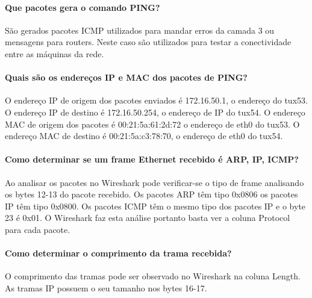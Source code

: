 \paragraph{Que pacotes gera o comando PING?}
São gerados pacotes ICMP utilizados para mandar erros da camada 3 ou mensagens para routers. Neste caso são utilizados para testar a conectividade entre as máquinas da rede.

\paragraph{Quais são os endereços IP e MAC dos pacotes de PING?}
O endereço IP de origem dos pacotes enviados é 172.16.50.1, o endereço do tux53. O endereço IP de destino é 172.16.50.254, o endereço de IP do tux54.  O endereço MAC de origem dos pacotes é 00:21:5a:61:2d:72 o endereço de eth0 do tux53. O endereço MAC de destino é 00:21:5a:c3:78:70, o endereço de eth0 do tux54. 

\paragraph{Como determinar se um frame Ethernet recebido é ARP, IP, ICMP?}
Ao analisar os pacotes no Wireshark pode verificar-se o tipo de frame analisando os bytes 12-13 do pacote recebido. Os pacotes ARP têm tipo 0x0806 os pacotes IP têm tipo 0x0800. Os pacotes ICMP têm o mesmo tipo dos pacotes IP e o byte 23 é 0x01. O Wireshark faz esta análise portanto basta ver a coluna Protocol para cada pacote.

\paragraph{Como determinar o comprimento da trama recebida?}
O comprimento das tramas pode ser observado no Wireshark na coluna Length. As tramas IP possuem o seu tamanho nos bytes 16-17.

